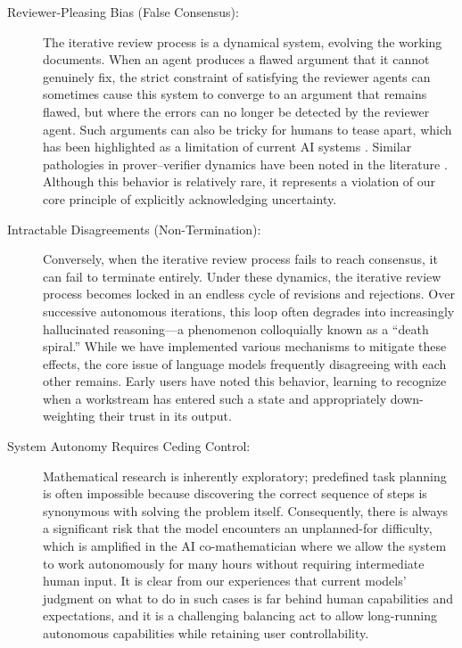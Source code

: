 \documentclass[11pt, a4paper, copyright, gdm]{google}
\begin{document}
\begin{description}
%
%

    \item [Reviewer-Pleasing Bias (False Consensus):] The iterative review process is a dynamical system, evolving the working documents.
    When an agent produces a flawed argument that it cannot genuinely fix, the strict constraint of satisfying the reviewer agents can sometimes cause this system to converge to an argument that remains flawed, but where the errors can no longer be detected by the reviewer agent.
    Such arguments can also be tricky for humans to tease apart, which has been highlighted as a limitation of current AI systems \citep{kontorovich2025shapemathcome}.
    Similar pathologies in prover--verifier dynamics have been noted in the literature \citep{dang2026escapingcognitivewellefficient}.
    Although this behavior is relatively rare, it represents a violation of our core principle of explicitly acknowledging uncertainty. 
    
    \item[Intractable Disagreements (Non-Termination):] Conversely, when the iterative review process fails to reach consensus, it can fail to terminate entirely.
    Under these dynamics, the iterative review process becomes locked in an endless cycle of revisions and rejections.
    Over successive autonomous iterations, this loop often degrades into increasingly hallucinated reasoning---a phenomenon colloquially known as a ``death spiral.''
    While we have implemented various mechanisms to mitigate these effects, the core issue of language models frequently disagreeing with each other remains.
    Early users have noted this behavior, learning to recognize when a workstream has entered such a state and appropriately down-weighting their trust in its output.

    \item[System Autonomy Requires Ceding Control:] Mathematical research is inherently exploratory; predefined task planning is often impossible because discovering the correct sequence of steps is synonymous with solving the problem itself.
    Consequently, there is always a significant risk that the model encounters an unplanned-for difficulty, which is amplified in the AI co-mathematician where we allow the system to work autonomously for many hours without requiring intermediate human input.
    It is clear from our experiences that current models' judgment on what to do in such cases is far behind human capabilities and expectations, and it is a challenging balancing act to allow long-running autonomous capabilities while retaining user controllability.


\end{description}
\end{document}
